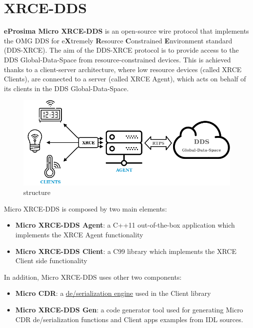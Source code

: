\section{XRCE-DDS}
\textbf{eProsima Micro XRCE-DDS} is an open-source wire protocol that implements the OMG DDS for e\textbf{X}tremely \textbf{R}esource \textbf{C}onstrained \textbf{E}nvironment standard (DDS-XRCE). The aim of the DDS-XRCE protocol is to provide access to the DDS Global-Data-Space from resource-constrained devices. This is achieved thanks to a client-server architecture, where low resource devices (called XRCE Clients), are connected to a server (called XRCE Agent), which acts on behalf of its clients in the DDS Global-Data-Space.
\begin{figure}[htb!]
    \centering
    \includegraphics[width=0.95\linewidth]{Img/uxrce_scope.png}
    \caption{structure}\label{f:uxrce}
    \vspace{-0.1in}
\end{figure}

Micro XRCE-DDS is composed by two main elements:
\begin{itemize}
    \item \textbf{Micro XRCE-DDS Agent}: a C++11 out-of-the-box application which implements the XRCE Agent functionality
    \item \textbf{Micro XRCE-DDS Client}: a C99 library which implements the XRCE Client side functionality
\end{itemize}

In addition, Micro XRCE-DDS uses other two components:
\begin{itemize}
    \item \textbf{Micro CDR}: a \underline{de/serialization engine} used in the Client library
    \item \textbf{Micro XRCE-DDS Gen}: a code generator tool used for generating Micro CDR de/serialization functions and Client apps examples from IDL sources.
\end{itemize}

